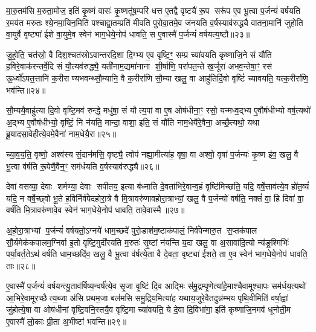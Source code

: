 {\anuvakamend[{य॒न्ति॒ दे॒वा विꣳ॑शति॒श्च॑॥८॥}]}

मा॒रु॒तम॑सि म॒रुता॒मोज॒ इति॑ कृ॒ष्णं वासः॑ कृ॒ष्णतू॑ष॒म्परि॑ धत्त ए॒तद्वै वृष्ट्यै॑ रू॒प सरू॑प ए॒व भू॒त्वा प॒र्जन्यं॑ वर्\mbox{}षयति र॒मय॑त मरुतः श्ये॒नमा॒यिन॒मिति॑ पश्चाद्वा॒तम्प्रति॑ मीवति पुरोवा॒तमे॒व ज॑नयति व॒र्\mbox{}षस्याव॑रुद्ध्यै वातना॒मानि॑ जुहोति वा॒युर्वै वृष्ट्या॑ ईशे वा॒युमे॒व स्वेन॑ भाग॒धेये॒नोप॑ धावति॒ स ए॒वास्मै॑ प॒र्जन्यं॑ वर्\mbox{}षयत्य॒ष्टौ॥२३॥

जु॒हो॒ति॒ चत॑स्रो॒ वै दिश॒श्चत॑स्रोऽवान्तरदि॒शा दि॒ग्भ्य ए॒व वृष्टि॒ꣳ॒ सम्प्र च्या॑वयति कृष्णाजि॒ने सं यौ॑ति ह॒विरे॒वाक॑रन्तर्वे॒दि सं यौ॒त्यव॑रुद्ध्यै॒ यती॑नाम॒द्यमा॑नाना शी॒र्\mbox{}षाणि॒ परा॑पत॒न्ते ख॒र्जूरा॑ अभव॒न्तेषा॒ꣳ॒ रस॑ ऊ॒र्ध्वो॑ऽपत॒त्तानि॑ क॒रीराण्यभवन्थ्सौ॒म्यानि॒ वै क॒रीरा॑णि सौ॒म्या खलु॒ वा आहु॑तिर्दि॒वो वृष्टिं॑ च्यावयति॒ यत्क॒रीरा॑णि॒ भव॑न्ति॥२४॥

सौ॒म्ययै॒वाहु॑त्या दि॒वो वृष्टि॒मव॑ रुन्द्धे॒ मधु॑षा॒ सं यौत्य॒पां वा ए॒ष ओष॑धीना॒ꣳ॒ रसो॒ यन्मध्व॒द्भ्य ए॒वौष॑धीभ्यो वर्\mbox{}ष॒त्यथो॑ अ॒द्भ्य ए॒वौष॑धीभ्यो॒ वृष्टिं॒ नि न॑यति॒ मान्दा॒ वाशा॒ इति॒ सं यौ॑ति नाम॒धेयै॑रे॒वैना॒ अच्छै॒त्यथो॒ यथा ब्रू॒यादसा॒वेहीत्ये॒वमे॒वैना॑ नाम॒धेयै॒रा॥२५॥

च्या॒व॒य॒ति॒ वृष्णो॒ अश्व॑स्य सं॒दान॑मसि॒ वृष्ट्यै॒ त्वोप॑ नह्या॒मीत्या॑ह॒ वृषा॒ वा अश्वो॒ वृषा॑ प॒र्जन्यः॑ कृ॒ष्ण इ॑व॒ खलु॒ वै भू॒त्वा व॑र्\mbox{}षति रू॒पेणै॒वैन॒ꣳ॒ सम॑र्धयति व॒र्\mbox{}षस्याव॑रुद्ध्यै॥२६॥

{\anuvakamend[{अ॒ष्टौ भव॑न्ति नाम॒धेयै॒रैका॒न्नत्रि॒ꣳ॒शच्च॑॥९॥}]}

देवा॑ वसव्या॒ देवाः शर्मण्या॒ देवाः सपीतय॒ इत्या ब॑ध्नाति दे॒वता॑भिरे॒वान्व॒हं वृष्टि॑मिच्छति॒ यदि॒ वर्\mbox{}षे॒त्ताव॑त्ये॒व हो॑त॒व्यं॑ यदि॒ न वर्\mbox{}षे॒च्छ्वो भू॒ते ह॒विर्निर्व॑पेदहोरा॒त्रे वै मि॒त्रावरु॑णावहोरा॒त्राभ्यां॒ खलु॒ वै प॒र्जन्यो॑ वर्\mbox{}षति॒ नक्तं॑ वा॒ हि दिवा॑ वा॒ वर्\mbox{}ष॑ति मि॒त्रावरु॑णावे॒व स्वेन॑ भाग॒धेये॒नोप॑ धावति॒ तावे॒वास्मै॥२७॥

अ॒हो॒रा॒त्राभ्यां प॒र्जन्यं॑ वर्\mbox{}षयतो॒ऽग्नये॑ धाम॒च्छदे॑ पुरो॒डाश॑म॒ष्टाक॑पालं॒ निर्व॑पेन्मारु॒त स॒प्तक॑पाल सौ॒र्यमेक॑कपालम॒ग्निर्वा इ॒तो वृष्टि॒मुदी॑रयति म॒रुतः॑ सृ॒ष्टां न॑यन्ति य॒दा खलु॒ वा अ॒सावा॑दि॒त्यो न्य॑ङ्र॒श्मिभिः॑ पर्या॒वर्त॒तेऽथ॑ वर्\mbox{}षति धाम॒च्छदि॑व॒ खलु॒ वै भू॒त्वा व॑र्\mbox{}षत्ये॒ता वै दे॒वता॒ वृष्ट्या॑ ईशते॒ ता ए॒व स्वेन॑ भाग॒धेये॒नोप॑ धावति॒ ताः॥२८॥

ए॒वास्मै॑ प॒र्जन्यं॑ वर्\mbox{}षयन्त्यु॒ताव॑र्\mbox{}षिष्य॒न्वर्\mbox{}ष॑त्ये॒व सृ॒जा वृ॒ष्टिं दि॒व आद्भिः स॑मु॒द्रम्पृ॒णेत्या॑हे॒माश्चै॒वामूश्चा॒पः सम॑र्धय॒त्यथो॑ आ॒भिरे॒वामूरच्छैत्य॒ब्जा अ॑सि प्रथम॒जा बल॑मसि समु॒द्रिय॒मित्या॑ह यथाय॒जुरे॒वैतदुन्न॑म्भय पृथि॒वीमिति॑ वर्\mbox{}षा॒ह्वां जु॑होत्ये॒षा वा ओष॑धीनां वृष्टि॒वनि॒स्तयै॒व वृष्टि॒मा च्या॑वयति॒ ये दे॒वा दि॒विभा॑गा॒ इति॑ कृष्णाजि॒नमव॑ धूनोती॒म ए॒वास्मै॑ लो॒काः प्री॒ता अ॒भीष्टा॑ भवन्ति॥२९॥

